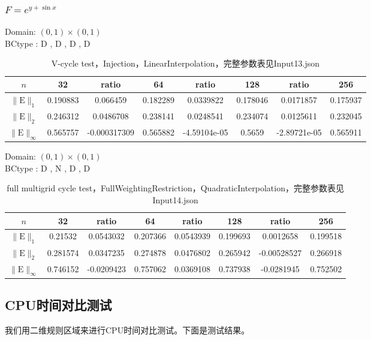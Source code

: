 \documentclass[a4paper,twoside]{ctexart}
\begin{document}
\newpage
\subsubsection{$F = e^{y+\sin{x}}$}

\noindent Domain: $(0,1)\times(0,1)$\\
BCtype : D , D , D , D
\begin{table}[htbp]
\centering\begin{tabular}{c|ccccccc}
\hline
$n$&32&ratio&64&ratio&128&ratio&256\\
\hline
$\|\mathrm{E}\|_1$&0.190883&0.066459&0.182289&0.0339822&0.178046&0.0171857&0.175937\\
\hline
$\|\mathrm{E}\|_2$&0.246312&0.0486708&0.238141&0.0248541&0.234074&0.0125611&0.232045\\
\hline
$\|\mathrm{E}\|_{\infty}$&0.565757&-0.000317309&0.565882&-4.59104e-05&0.5659&-2.89721e-05&0.565911\\
\hline
\end{tabular}
\caption{V-cycle test，Injection，LinearInterpolation，完整参数表见Input13.json}
\end{table}

\noindent Domain: $(0,1)\times(0,1)$\\
BCtype : D , N , D , D
\begin{table}[htbp]
\centering\begin{tabular}{c|ccccccc}
\hline
$n$&32&ratio&64&ratio&128&ratio&256\\
\hline
$\|\mathrm{E}\|_1$&0.21532&0.0543032&0.207366&0.0543939&0.199693&0.0012658&0.199518\\
\hline
$\|\mathrm{E}\|_2$&0.281574&0.0347235&0.274878&0.0476802&0.265942&-0.00528527&0.266918\\
\hline
$\|\mathrm{E}\|_{\infty}$&0.746152&-0.0209423&0.757062&0.0369108&0.737938&-0.0281945&0.752502\\
\hline
\end{tabular}
\caption{full multigrid cycle test，FullWeightingRestriction，QuadraticInterpolation，完整参数表见Input14.json}
\end{table}

\newpage
\subsection{CPU时间对比测试}
我们用二维规则区域来进行CPU时间对比测试。下面是测试结果。
\end{document}
